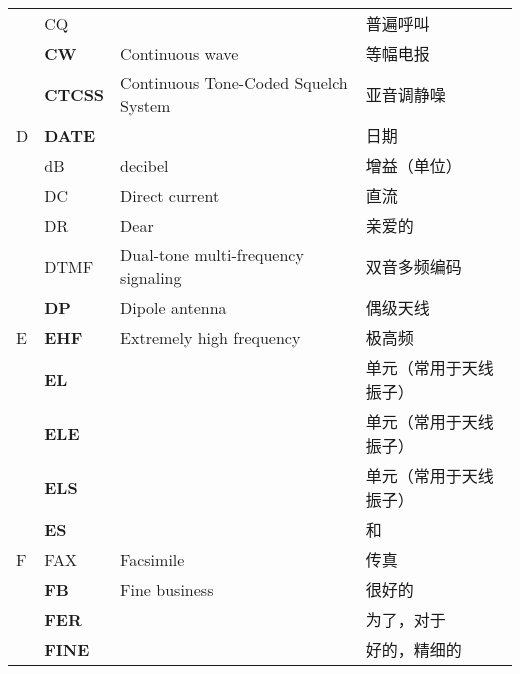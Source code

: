 \begin{longtable}[l]{llll}
    & CQ                                &                                         & 普遍呼叫                \\
    & \textbf{CW}                       & Continuous wave                         & 等幅电报                \\
    & \textbf{CTCSS}                    & Continuous Tone-Coded Squelch System    & 亚音调静噪               \\
  D & \textbf{DATE}                     &                                         & 日期                  \\
    & dB                                & decibel                                 & 增益（单位）              \\
    & DC                                & Direct current                          & 直流                  \\
    & DR                                & Dear                                    & 亲爱的                 \\
    & DTMF                              & Dual-tone multi-frequency signaling     & 双音多频编码              \\
    & \textbf{DP}                       & Dipole antenna                          & 偶级天线                \\
  E & \textbf{EHF}                      & Extremely high frequency                & 极高频                 \\
    & \textbf{EL}                       &                                         & 单元（常用于天线振子）         \\
    & \textbf{ELE}                      &                                         & 单元（常用于天线振子）         \\
    & \textbf{ELS}                      &                                         & 单元（常用于天线振子）         \\
    & \textbf{ES}                       &                                         & 和                   \\
  F & FAX                               & Facsimile                               & 传真                  \\
    & \textbf{FB}                       & Fine business                           & 很好的                 \\
    & \textbf{FER}                      &                                         & 为了，对于               \\
    & \textbf{FINE}                     &                                         & 好的，精细的              \\

\end{longtable}
